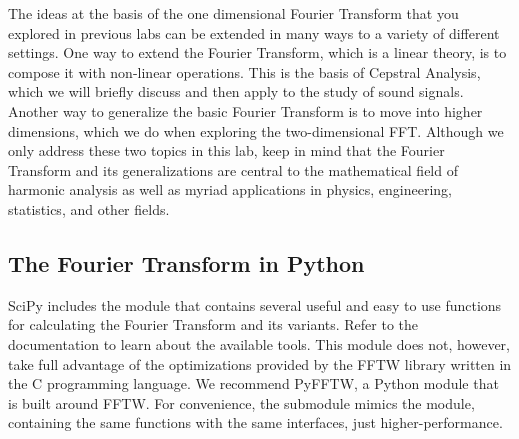 
The ideas at the basis of the one dimensional Fourier Transform that you explored in previous labs can be
extended in many ways to a variety of different settings. One way to extend the Fourier Transform, which is
a linear theory, is to compose it with non-linear operations. This is the basis of Cepstral Analysis, which we
will briefly discuss and then apply to the study of sound signals. Another way to generalize the basic
Fourier Transform is to move into higher dimensions, which we do when exploring the two-dimensional FFT.
Although we only address these two topics in this lab, keep in mind that the Fourier Transform and its
generalizations are central to the mathematical field of harmonic analysis as well as myriad applications
in physics, engineering, statistics, and other fields.

\subsection*{The Fourier Transform in Python}
SciPy includes the module  that contains several useful and easy to use functions
for calculating the Fourier Transform and its variants. Refer to the documentation to learn about
the available tools. This module does not, however, take full advantage of the optimizations provided
by the FFTW library written in the C programming language. We recommend PyFFTW, a Python module that 
is built around FFTW. For convenience, the submodule  mimics the 
 module, containing the same functions with the same interfaces, just higher-performance.

